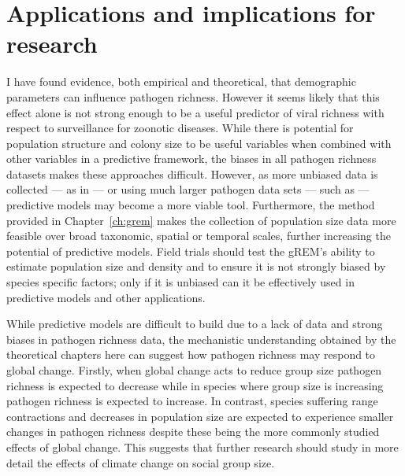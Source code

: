 




\section{Applications and implications for research}

I have found evidence, both empirical and theoretical, that demographic parameters can influence pathogen richness.
However it seems likely that this effect alone is not strong enough to be a useful predictor of viral richness with respect to surveillance for zoonotic diseases.
While there is potential for population structure and colony size to be useful variables when combined with other variables in a predictive framework, the biases in all pathogen richness datasets makes these approaches difficult.
However, as more unbiased data is collected --- as in \textcite{anthony2013strategy, anthony2015non} --- or using much larger pathogen data sets --- such as \textcite{wardeh2015database} --- predictive models may become a more viable tool.
Furthermore, the method provided in Chapter~\ref{ch:grem} makes the collection of population size data more feasible over broad taxonomic, spatial or temporal scales, further increasing the potential of predictive models.
Field trials should test the gREM's ability to estimate population size and density and to ensure it is not strongly biased by species specific factors; only if it is unbiased can it be effectively used in predictive models and other applications.

While predictive models are difficult to build due to a lack of data and strong biases in pathogen richness data, the mechanistic understanding obtained by the theoretical chapters here can suggest how pathogen richness may respond to global change.
Firstly, when global change acts to reduce group size \cite{lehmann2010apes, zunino2007habitat, manor2003impact, atwood2006influence} pathogen richness is expected to decrease while in species where group size is increasing \cite{lehmann2010apes} pathogen richness is expected to increase.
In contrast, species suffering range contractions \cite{thomas2004extinction} and decreases in population size \cite{craigie2010large} are expected to experience smaller changes in pathogen richness despite these being the more commonly studied effects of global change.
This suggests that further research should study in more detail the effects of climate change on social group size.

